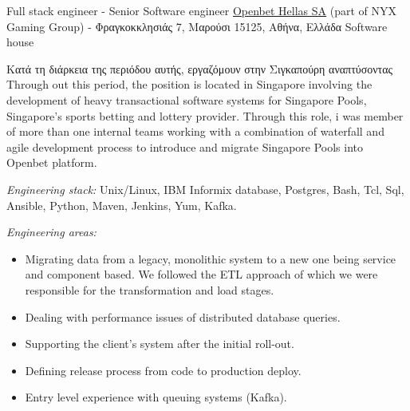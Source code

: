 \documentclass[arial, greek, nologo, notitle, totpages]{europecv2013}
\begin{document}

\begin{europecv}

\ecvpersonalinfo[10pt]



	{\foreignlanguage{english}{Full stack engineer - Senior Software engineer}}
    {\foreignlanguage{english}{\href{http://www.openbet.com}{Openbet Hellas SA} (part of NYX Gaming Group)} - Φραγκοκκλησιάς 7, Μαρούσι 15125, Αθήνα, Ελλάδα}
    {\foreignlanguage{english}{Software house}}
    {
    \begin{small}
    	Κατά τη διάρκεια της περιόδου αυτής, εργαζόμουν στην Σιγκαπούρη αναπτύσοντας
    	Through out this period, the position is located in Singapore involving the development of heavy transactional software systems for Singapore Pools, Singapore's sports betting and lottery provider. Through this role, i was member of more than one internal teams working with a combination of waterfall and agile development process to introduce and migrate Singapore Pools into Openbet platform.
    	\begin{flushleft}
    		\foreignlanguage{english}{\textit{Engineering stack:} Unix/Linux, IBM Informix database, Postgres, Bash, Tcl, Sql, Ansible, Python, Maven, Jenkins, Yum, Kafka.}
    	\end{flushleft}
    	\textit{Engineering areas:}
    	\begin{itemize}[label=\raisebox{0.25ex}{\tiny$\bullet$}, leftmargin=+1.0cm]
			\item Migrating data from a legacy, monolithic system to a new one being service and component based. We followed the ETL approach of which we were responsible for the transformation and load stages.
			\item Dealing with performance issues of distributed database queries.
			\item Supporting the client's system after the initial roll-out.
			\item Defining release process from code to production deploy.
			\item Entry level experience with queuing systems (Kafka).
		\end{itemize}
	\end{small}
    }


\end{europecv}
\end{document}
